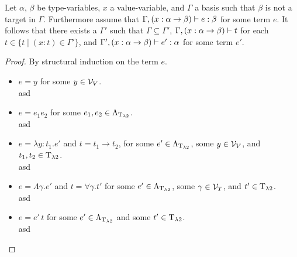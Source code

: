 \begin{claim}
Let $\alpha$, $\beta$ be type-variables, $x$ a value-variable, and $\Gamma$ a %
basis such that $\beta$ is not a target in $\Gamma$. %
Furthermore assume that $\Gamma,(x:\alpha\to\beta)\vdash e:\beta$ for some term $e$. It follows that there exists a $\Gamma'$ such that $\Gamma\subseteq\Gamma'$, $\Gamma,(x:\alpha\to\beta)\vdash t$ for each $t\in\{t\mid (x:t)\in\Gamma'\}$, and $\Gamma',(x:\alpha\to\beta)\vdash e':\alpha$ for some term $e'$. %
\end{claim}
\begin{proof}
By structural induction on the term $e$.
\begin{itemize}
	\item[] \underline{$e=y$} for some $y\in\mathcal{V}_V$.\\
		asd
	\item[] \underline{$e=e_1e_2$} for some $e_1,e_2\in\Lambda_{\text{T}_{\lambda2}}$.\\
		asd
	\item[] \underline{$e=\lambda y:t_1.e'$} and $t=t_1\to t_2$, for some $e'\in\Lambda_{\text{T}_{\lambda2}}$, some $y\in\mathcal{V}_V$, and $t_1,t_2\in\text{T}_{\lambda2}$.\\
		asd
	\item[] \underline{$e=\Lambda\gamma.e'$} and $t=\forall\gamma.t'$ for some $e'\in\Lambda_{\text{T}_{\lambda2}}$, some $\gamma\in\mathcal{V}_T$, and $t'\in\text{T}_{\lambda2}$.\\
		asd
	\item[] \underline{$e=e'\,t$} for some $e'\in\Lambda_{\text{T}_{\lambda2}}$ and some $t'\in\text{T}_{\lambda2}$.\\
		asd
\end{itemize}
\end{proof}